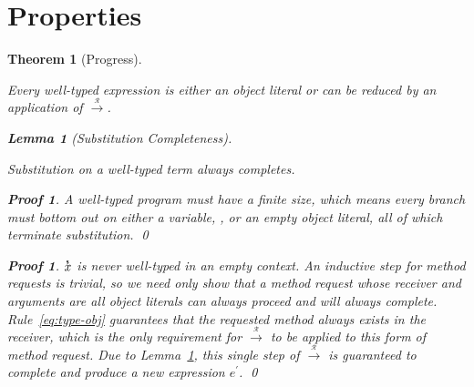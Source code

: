 \documentclass[a4paper, 11pt]{article}
\newcommand{\key}[1]{{\sffamily\bfseries#1}}
\newcommand{\self}{\text{\key{self}}}
\def\rto{\overset{_\mathcal{R}}\longrightarrow}
\def\xs{\overset{_\text{\sffamily\bfseries s}}x}
\theoremstyle{theorem}
\newtheorem{theorem}{Theorem}
\theoremstyle{lemma}
\newtheorem{lemma}{Lemma}[theorem]
\theoremstyle{tproof}
\newtheorem*{tproof}{Proof}
\theoremstyle{lproof}
\newtheorem*{lproof}{Proof}
\theoremstyle{tcase}
\theoremstyle{lcase}
\begin{document}
\section{Properties}

\begin{theorem}[Progress]
\label{th:progress}

Every well-typed expression is either an object literal or can be reduced by an
application of $\rto$.

\begin{lemma}[Substitution Completeness]
\label{lem:sub-complete}

Substitution on a well-typed term always completes.

\begin{lproof}
A well-typed program must have a finite size, which means every branch must
bottom out on either a variable, \self, or an empty object literal, all of which
terminate substitution. \qed
\end{lproof}

\end{lemma}

\begin{tproof}

$\xs$ is never well-typed in an empty context.  An inductive step for method
requests is trivial, so we need only show that a method request whose receiver
and arguments are all object literals can always proceed and will always
complete.  Rule~\ref{eq:type-obj} guarantees that the requested method always
exists in the receiver, which is the only requirement for $\rto$ to be applied
to this form of method request.  Due to Lemma~\ref{lem:sub-complete}, this
single step of $\rto$ is guaranteed to complete and produce a new expression
$e^\prime$. \qed

\end{tproof}

\end{theorem}
\end{document}
